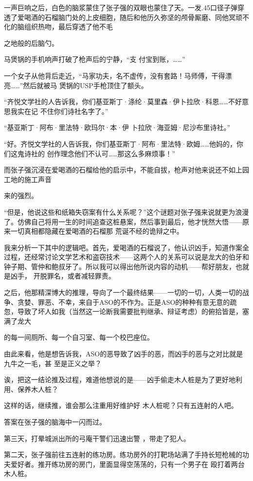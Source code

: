 \documentclass{article}
\begin{document}
一声巨响之后，白色的脑浆蒙住了张子强的双眼也蒙住了天。一发.45口径子弹穿透了爱喝酒的石榴脑门处的上皮细胞，随后和他历久弥坚的颅骨厮磨、同他冥顽不化的脑组织热吻，最后穿透了他不毛

\newpage
之地般的后脑勺。 

马煲锅的手机响声打破了枪声后的宁静，“支
付宝到账，……” 

一个女子从他背后走近，“马家功夫，名不虚传，没有套路！马师傅，干得漂亮……”然后就被马
煲锅的USP手枪顶住了额头。 

“齐悦文学社的人告诉我，你们基亚斯丁·涤纶·莫里森·伊卜拉欣·科恩……不好意思我实在记
不住你们诗社名字了。” 

“基亚斯丁·阿布·里法特·欧玛尔·本·伊
卜拉欣·海亚姆·尼沙布里诗社。” 

“好。齐悦文学社的人告诉我，你们基亚斯丁·阿布·里法特·欧姆……他妈的，你们这鬼诗社的
创作理念他们不认可……那这么多麻烦事！” 

而张子强沉浸在爱喝酒的石榴给他的启示中，不能自拔，枪声对他来说还不如上园工地的施工声音
\newpage

来的强烈。 

“但是，他说这些和纸箱失窃案有什么关系呢？”这个谜题对张子强来说就更为浪漫了。仿佛自己将用一生的时间追查这桩悬案，然后事到最后，他才恍然大悟——原来一切真相都隐藏在爱喝酒的石榴那
荒诞不经的诡辩之中。 

我来分析一下其中的逻辑吧。首先，爱喝酒的石榴说了，他认识凶手，知道作案全过程，还经常讨论文学艺术和盗窃技术——这两个人的关系可以说是龙大的伯牙和钟子期、管仲和鲍叔牙了。所以我可以得出他所说内容的动机——帮好朋友，也就是凶手，
开脱罪名，或者减轻罪责。 

之后，他那精深博大的推理，导向了一个最终结果——一切的一切，人类一切的战争、贪婪、罪恶、不幸，来自于ASO的不作为。正是ASO的种种有意无意的疏忽，导致了坏人如我（当然这一论断我需要批判继承、辩证考虑）的俯拾皆是，塞满了龙大

\newpage
的每一间厕所、每一个自习室、每一个校巴座位。 

由此来看，他是想告诉我，ASO的恶导致了凶手的恶，而凶手的恶与之对比就是九牛之一毛，甚
至是正义之举？ 

诶，把这一结论推及过程，难道他想说的是——凶手偷走木人桩是为了更好地利用、保养木人桩？

这样的话，继续推，谁会那么注重用好维护好
木人桩呢？只有五连射的人吧。 


答案在张子强的脑海中一闪而过。 

第三天，打晕城派出所的弓庵干警们迅速出警
，带走了犯人。 

第二天，张子强前往五连射的练功房。练功房外的打靶场站满了手持长短枪械的功夫爱好者。推开练功房的房门，里面显得空荡荡的，只有一个男子在
殴打着两台木人桩。 
\end{document}
